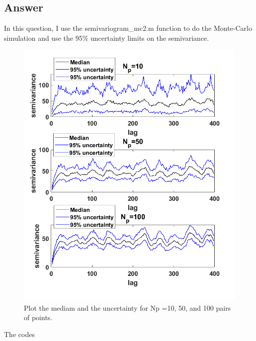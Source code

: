 \documentclass[
	12pt, %
]{fphw}
\begin{document}

\subsection*{Answer}

In this question, I use the semivariogram\_mc2.m function to do the Monte-Carlo simulation and use the 95\% uncertainty limits on the semivariance.

\begin{figure}[htbp]
	\centering
	\includegraphics[width=0.7\columnwidth]{Q4.png} 
	\caption{Plot the mediam and the uncertainty
		for Np =10, 50, and 100 pairs of points.}
\end{figure}


The codes 
\end{document}
